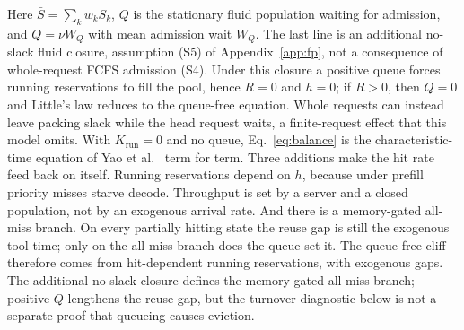 Here $\bar S=\sum_kw_kS_k$, $Q$ is the stationary fluid population waiting for admission, and $Q=\nu W_Q$ with mean admission wait $W_Q$. The last line is an additional no-slack fluid closure, assumption (S5) of Appendix~\ref{app:fp}, not a consequence of whole-request FCFS admission (S4). Under this closure a positive queue forces running reservations to fill the pool, hence $R=0$ and $h=0$; if $R>0$, then $Q=0$ and Little's law reduces to the queue-free equation. Whole requests can instead leave packing slack while the head request waits, a finite-request effect that this model omits. With $K_{\mathrm{run}}=0$ and no queue, Eq.~\eqref{eq:balance} is the characteristic-time equation of Yao et al.~\citep{yao2026multiturn} term for term. Three additions make the hit rate feed back on itself. Running reservations depend on $h$, because under prefill priority misses starve decode. Throughput is set by a server and a closed population, not by an exogenous arrival rate. And there is a memory-gated all-miss branch. On every partially hitting state the reuse gap is still the exogenous tool time; only on the all-miss branch does the queue set it. The queue-free cliff therefore comes from hit-dependent running reservations, with exogenous gaps. The additional no-slack closure defines the memory-gated all-miss branch; positive $Q$ lengthens the reuse gap, but the turnover diagnostic below is not a separate proof that queueing causes eviction.

